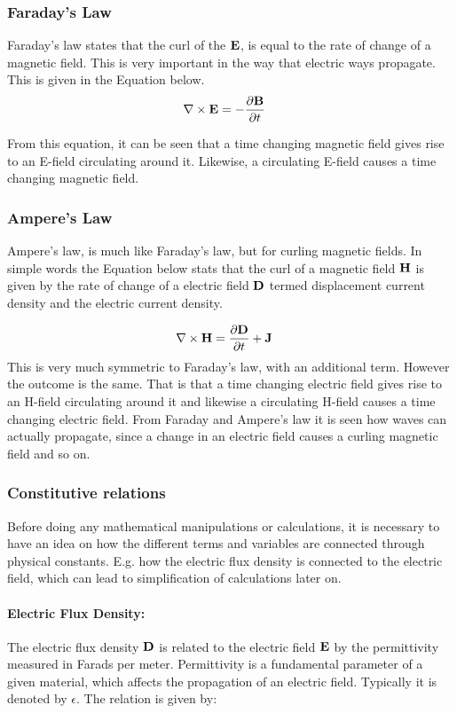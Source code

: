 \subsubsection{Faraday's Law}
Faraday's law states that the curl of the $\bold{E}$, is equal to the rate of change of a magnetic field. This is very important in the way that electric ways propagate. This is given in the Equation below. 
\begin{align}
\nabla \times \bold{E} &= - \frac{\partial \bold{B}}{\partial t}
\end{align}

From this equation, it can be seen that a time changing magnetic field gives rise to an E-field circulating around it. Likewise, a circulating E-field causes a time changing magnetic field.   

\subsubsection{Ampere's Law}
Ampere's law, is much like Faraday's law, but for curling magnetic fields. In simple words the Equation below stats that the curl of a magnetic field $\bold{H}$ is given by the rate of change of a electric field $\bold{D}$ termed displacement current density and the electric current density.

\begin{align}
\nabla \times \bold{H} &= \frac{\partial \bold{D}}{\partial t} + \bold{J} 
\end{align}
This is very much symmetric to Faraday's law, with an additional term. However the outcome is the same. That is that a time changing electric field gives rise to an H-field circulating around it and likewise a circulating H-field causes a time changing electric field. From Faraday and Ampere's law it is seen how waves can actually propagate, since a change in an electric field causes a curling magnetic field and so on.    

\subsubsection{Constitutive relations}
Before doing any mathematical manipulations or calculations, it is necessary to have an idea on how the different terms and variables are connected through physical constants. E.g. how the electric flux density is connected to the electric field, which can lead to simplification of calculations later on.

\paragraph{Electric Flux Density:} The electric flux density $\bold{D}$ is related to the electric field $\bold{E}$ by the permittivity measured in Farads per meter. Permittivity is a fundamental parameter of a given material, which affects the propagation of an electric field. Typically it is denoted by $\epsilon$. The relation is given by: 

